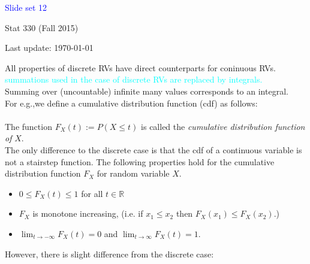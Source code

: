 \documentclass[20pt,landscape]{foils}
\newcommand{\no}{\noindent}
\newcommand{\bul}{\hspace*{.3in}{\textcolor{red}{$\bullet$ \ }}}
\begin{document}
\LogoOff

\foilhead[1.3in]{}
\centerline{\LARGE \textcolor{blue}{Slide set 12}}
\vspace{0.3in}
\centerline{\large Stat 330 (Fall 2015)}
\vspace{0.2in}
\centerline{\tiny Last update: \today}
\setcounter{page}{0}

\foilhead[-.7in]{\textcolor{blue}{Continuous Random Variables}}
\no All properties of discrete RVs  have direct counterparts for coninuous RVs.\\[.1in]
\no  {\textcolor{magenta}{One basic difference:}}  {\textcolor{cyan}{summations used in the case of discrete RVs are replaced by integrals.}}\\[.1in]
\no Summing over (uncountable) infinite many values corresponds to an integral.\\[.2in]
\no For e.g.,we define a cumulative distribution 
function (cdf) as follows:\\[.1in]
\no {\textcolor{magenta}{Definition: }}{\textcolor{cyan}{ CDF of a $X$ is a continuous random variable:}}\\[.1in]
    The function $F_{X}(t) := P(X \le t)$ is called the {\it 
    cumulative distribution function of} $X$.\\[.15in]
\no The only difference to the discrete case is that the cdf of a continuous variable is not a stairstep function.
\no The following properties hold for the cumulative distribution function 
$F_{X}$ for random variable $X$.
\begin{itemize}
    \item[\bul] $ 0 \le F_{X}(t) \le 1$ for all $t \in \mathbb{R}$
    \item[\bul] $F_{X}$ is monotone increasing, (i.e. if $x_{1} \le x_{2}$ 
    then $F_{X}(x_{1}) \le F_{X}(x_{2})$.)
    \item[\bul] $\lim_{t \rightarrow -\infty}F_{X}(t) = 0$ and $\lim_{t \rightarrow \infty}F_{X}(t) = 1$.
\end{itemize}
\no However, there is slight difference from the discrete 
case:\\[.1in]
\end{document}
